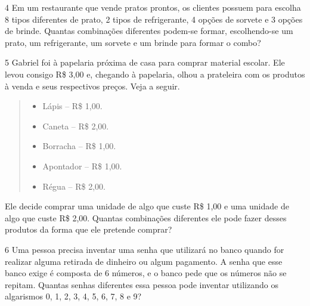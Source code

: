 \num{4} Em um restaurante que vende pratos prontos, os clientes possuem para
escolha 8 tipos diferentes de prato, 2 tipos de refrigerante, 4 opções
de sorvete e 3 opções de brinde. Quantas combinações diferentes podem-se
formar, escolhendo-se um prato, um refrigerante, um sorvete e um brinde para
formar o combo?

\begin{mdframed}[linewidth=2pt,linecolor=salmao,roundcorner=2pt]
\vspace{2cm}
\end{mdframed}

\num{5} Gabriel foi à papelaria próxima de casa para comprar material
escolar. Ele levou consigo R\$ 3,00 e, chegando à papelaria, olhou a
prateleira com os produtos à venda e seus respectivos preços. Veja a seguir.

\pagebreak
\begin{quote}
\begin{itemize}
  \item Lápis -- R\$ 1,00.
  \item Caneta -- R\$ 2,00.
  \item Borracha -- R\$ 1,00.
  \item Apontador -- R\$ 1,00.
  \item Régua -- R\$ 2,00.
\end{itemize}
\end{quote}

Ele decide comprar uma unidade de algo que custe R\$ 1,00 e uma unidade de
algo que custe R\$ 2,00. Quantas combinações diferentes ele pode fazer
desses produtos da forma que ele pretende comprar?

\begin{mdframed}[linewidth=2pt,linecolor=salmao,roundcorner=2pt]



\vspace{2cm}
\end{mdframed}

\num{6} Uma pessoa precisa inventar uma senha que utilizará no banco quando for
realizar alguma retirada de dinheiro ou algum pagamento. A senha que esse
banco exige é composta de 6 números, e o banco pede que os números
não se repitam. Quantas senhas diferentes essa pessoa pode inventar
utilizando os algarismos 0, 1, 2, 3, 4, 5, 6, 7, 8 e 9?

